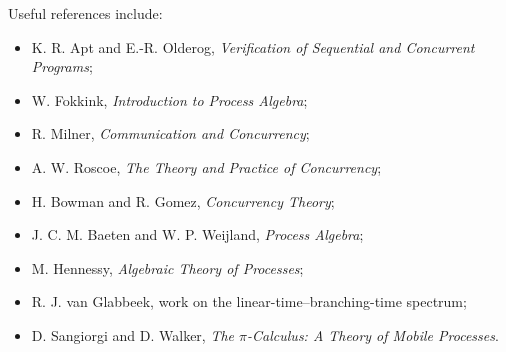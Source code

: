\documentclass[a4paper]{article}
\begin{document}
Useful references include:
\begin{itemize}
    \item K. R. Apt and E.-R. Olderog, \emph{Verification of Sequential and Concurrent Programs};
    \item W. Fokkink, \emph{Introduction to Process Algebra};
    \item R. Milner, \emph{Communication and Concurrency};
    \item A. W. Roscoe, \emph{The Theory and Practice of Concurrency};
    \item H. Bowman and R. Gomez, \emph{Concurrency Theory};
    \item J. C. M. Baeten and W. P. Weijland, \emph{Process Algebra};
    \item M. Hennessy, \emph{Algebraic Theory of Processes};
    \item R. J. van Glabbeek, work on the linear-time--branching-time spectrum;
    \item D. Sangiorgi and D. Walker, \emph{The \(\pi\)-Calculus: A Theory of Mobile Processes}.
\end{itemize}
\end{document}
